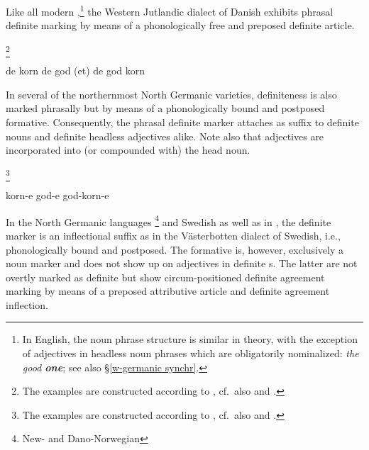 {Like all modern ,\footnote{In English, the noun phrase structure is similar in theory, with the exception of adjectives in headless noun phrases which are obligatorily nominalized: \textit{the good \textbf{one}}; see also \S\ref{w-germanic synchr}.} the Western Jutlandic dialect of Danish exhibits phrasal definite marking by means of a phonologically free and preposed definite article.
\begin{exe}
\footnote{The examples are constructed according to \citet{lund1932}, cf.~also \citet[121–122]{delsing1993} and \citet{dahl2003}.}
\begin{xlist}
\ex de korn {}
\ex de god (et) {}
\ex de god korn {}
\end{xlist}
\end{exe}

In several of the northernmost North Germanic varieties, definiteness is also marked phrasally but by means of a phonologically bound and postposed formative. Consequently, the phrasal definite marker attaches as suffix to definite nouns and definite headless adjectives alike. Note also that adjectives are incorporated into (or compounded with) the head noun. 
\begin{exe}
\footnote{The examples are constructed according to \citet{astrom1893}, cf.~also \citet[122–123]{delsing1993} and \citet{dahl2003}.}
\begin{xlist}
\ex korn-e {}
\ex god-e {}
\ex god-korn-e {}
\end{xlist}
\end{exe}

In the North Germanic languages \footnote{New- and Dano-Norwegian} and Swedish as well as in , the definite marker is an inflectional suffix as in the Västerbotten dialect of Swedish, i.e., phonologically bound and postposed. The formative is, however, exclusively a noun marker and does not show up on adjectives in definite s. The latter are not overtly marked as definite but show circum-positioned definite agreement marking by means of a preposed attributive article and definite agreement inflection.
\begin{exe}
\begin{xlist}
\end{xlist}
\end{exe}

}
